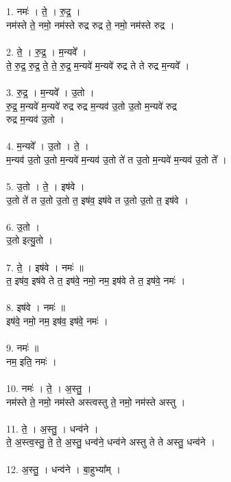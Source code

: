 \subsection{}
1. नमः॑ । ते॒ । रु॒द्र॒ ।\\
नम॑स्ते ते॒ नमो॒ नम॑स्ते रुद्र रुद्र ते॒ नमो॒ नम॑स्ते रुद्र ।\\
\\
2. ते॒ । रु॒द्र॒ । म॒न्यवे᳚ ।\\
ते॒ रु॒द्र॒ रु॒द्र॒ ते॒ ते॒ रु॒द्र॒ म॒न्यवे॑ म॒न्यवे॑ रुद्र ते ते रुद्र म॒न्यवे᳚ ।\\
\\
3. रु॒द्र॒ । म॒न्यवे᳚ । उ॒तो ।\\
रु॒द्र॒ म॒न्यवे॑ म॒न्यवे॑ रुद्र रुद्र म॒न्यव॑ उ॒तो उ॒तो म॒न्यवे॑ रुद्र\\
रुद्र म॒न्यव॑ उ॒तो ।\\
\\
4. म॒न्यवे᳚ । उ॒तो । ते॒ ।\\
म॒न्यव॑ उ॒तो उ॒तो म॒न्यवे॑ म॒न्यव॑ उ॒तो ते॑ त उ॒तो म॒न्यवे॑ म॒न्यव॑ उ॒तो ते᳚ ।\\
\\
5. उ॒तो । ते॒ । इष॑वे ।\\
उ॒तो ते॑ त उ॒तो उ॒तो त॒ इष॑व॒ इष॑वे त उ॒तो उ॒तो त॒ इष॑वे ।\\
\\
6. उ॒तो ।\\
उ॒तो इत्यु॒तो ।\\
\\
7. ते॒ । इष॑वे । नमः॑ ॥\\
त॒ इष॑व॒ इष॑वे ते त॒ इष॑वे॒ नमो॒ नम॒ इष॑वे ते त॒ इष॑वे॒ नमः॑ ।\\
\\
8. इष॑वे । नमः॑ ॥\\
इष॑वे॒ नमो॒ नम॒ इष॑व॒ इष॑वे॒ नमः॑ ।\\
\\
9. नमः॑ ॥\\
नम॒ इति॒ नमः॑ ।\\
\\
10. नमः॑ । ते॒ । अ॒स्तु॒ ।\\
नम॑स्ते ते॒ नमो॒ नम॑स्ते अस्त्वस्तु ते॒ नमो॒ नम॑स्ते अस्तु ।\\
\\
11. ते॒ । अ॒स्तु॒ । धन्व॑ने ।\\
ते॒ अ॒स्त्व॒स्तु॒ ते॒ ते॒ अ॒स्तु॒ धन्व॑ने॒ धन्व॑ने अस्तु ते ते अस्तु॒ धन्व॑ने ।\\
\\
12. अ॒स्तु॒ । धन्व॑ने । बा॒हुभ्या᳚म् ।\\
